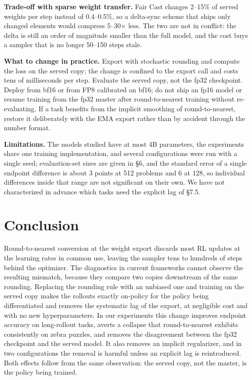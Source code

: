 \documentclass[
  10pt,
]{article}
\begin{document}
\textbf{Trade-off with sparse weight transfer.} Fair Cast changes 2--15\% of served weights per step
instead of 0.4--0.5\%, so a delta-sync scheme that ships only changed elements \cite{r25} would
compress 5--30× less. The two are not in conflict: the delta is still an order of magnitude smaller
than the full model, and the cost buys a sampler that is no longer 50--150 steps stale.

\textbf{What to change in practice.} Export with stochastic rounding and compute the loss on the
served copy; the change is confined to the export call and costs tens of milliseconds per step.
Evaluate the served copy, not the fp32 checkpoint. Deploy from bf16 or from FP8 calibrated on bf16;
do not ship an fp16 model or resume training from the fp32 master after round-to-nearest training
without re-evaluating. If a task benefits from the implicit smoothing of round-to-nearest, restore
it deliberately with the EMA export rather than by accident through the number format.

\textbf{Limitations.} The models studied have at most 4B parameters, the experiments share one
training implementation, and several configurations were run with a single seed; evaluation-set
sizes are given in §6, and the standard error of a single endpoint difference is about 3 points at
512 problems and 6 at 128, so individual differences inside that range are not significant on their
own. We have not characterized in advance which tasks need the explicit lag of §7.5.

\section{Conclusion}\label{conclusion}

Round-to-nearest conversion at the weight export discards most RL updates at the learning rates in
common use, leaving the sampler tens to hundreds of steps behind the optimizer. The diagnostics in
current frameworks cannot observe the resulting mismatch, because they compare two copies downstream
of the same rounding. Replacing the rounding rule with an unbiased one and training on the served
copy makes the rollouts exactly on-policy for the policy being differentiated and removes the
systematic lag of the export, at negligible cost and with no new hyperparameters. In our experiments
this change improves endpoint accuracy on long-rollout tasks, averts a collapse that
round-to-nearest exhibits consistently on zebra puzzles, and removes the disagreement between the
fp32 checkpoint and the served model. It also removes an implicit regularizer, and in two
configurations the removal is harmful unless an explicit lag is reintroduced. Both effects follow
from the same observation: the served copy, not the master, is the policy being trained.
\end{document}
